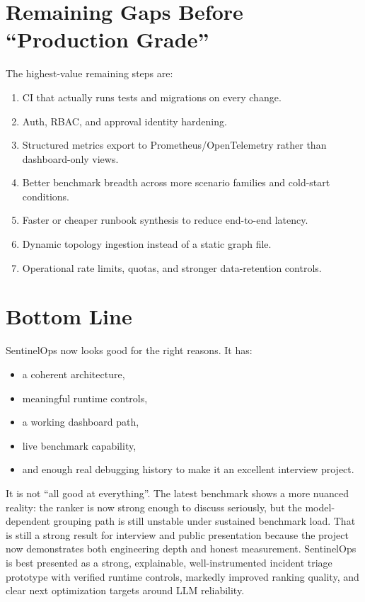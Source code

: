 \documentclass[11pt]{article}
\begin{document}
\section{Remaining Gaps Before ``Production Grade''}
The highest-value remaining steps are:
\begin{enumerate}[leftmargin=*]
\item CI that actually runs tests and migrations on every change.
\item Auth, RBAC, and approval identity hardening.
\item Structured metrics export to Prometheus/OpenTelemetry rather than dashboard-only views.
\item Better benchmark breadth across more scenario families and cold-start conditions.
\item Faster or cheaper runbook synthesis to reduce end-to-end latency.
\item Dynamic topology ingestion instead of a static graph file.
\item Operational rate limits, quotas, and stronger data-retention controls.
\end{enumerate}

\section{Bottom Line}
SentinelOps now looks good for the right reasons. It has:
\begin{itemize}[leftmargin=*]
\item a coherent architecture,
\item meaningful runtime controls,
\item a working dashboard path,
\item live benchmark capability,
\item and enough real debugging history to make it an excellent interview project.
\end{itemize}

It is not ``all good at everything''. The latest benchmark shows a more nuanced reality: the ranker is now strong enough to discuss seriously, but the model-dependent grouping path is still unstable under sustained benchmark load. That is still a strong result for interview and public presentation because the project now demonstrates both engineering depth and honest measurement. SentinelOps is best presented as a strong, explainable, well-instrumented incident triage prototype with verified runtime controls, markedly improved ranking quality, and clear next optimization targets around LLM reliability.
\end{document}

